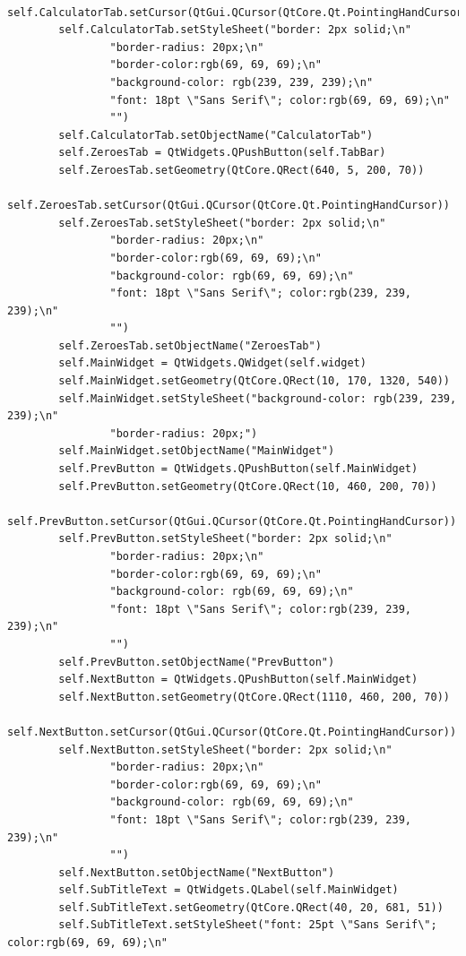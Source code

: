 \documentclass[12pt]{article}
\begin{document}
\begin{lstlisting}
        self.CalculatorTab.setCursor(QtGui.QCursor(QtCore.Qt.PointingHandCursor))
        self.CalculatorTab.setStyleSheet("border: 2px solid;\n"
                "border-radius: 20px;\n"
                "border-color:rgb(69, 69, 69);\n"
                "background-color: rgb(239, 239, 239);\n"
                "font: 18pt \"Sans Serif\"; color:rgb(69, 69, 69);\n"
                "")
        self.CalculatorTab.setObjectName("CalculatorTab")
        self.ZeroesTab = QtWidgets.QPushButton(self.TabBar)
        self.ZeroesTab.setGeometry(QtCore.QRect(640, 5, 200, 70))
        self.ZeroesTab.setCursor(QtGui.QCursor(QtCore.Qt.PointingHandCursor))
        self.ZeroesTab.setStyleSheet("border: 2px solid;\n"
                "border-radius: 20px;\n"
                "border-color:rgb(69, 69, 69);\n"
                "background-color: rgb(69, 69, 69);\n"
                "font: 18pt \"Sans Serif\"; color:rgb(239, 239, 239);\n"
                "")
        self.ZeroesTab.setObjectName("ZeroesTab")
        self.MainWidget = QtWidgets.QWidget(self.widget)
        self.MainWidget.setGeometry(QtCore.QRect(10, 170, 1320, 540))
        self.MainWidget.setStyleSheet("background-color: rgb(239, 239, 239);\n"
                "border-radius: 20px;")
        self.MainWidget.setObjectName("MainWidget")
        self.PrevButton = QtWidgets.QPushButton(self.MainWidget)
        self.PrevButton.setGeometry(QtCore.QRect(10, 460, 200, 70))
        self.PrevButton.setCursor(QtGui.QCursor(QtCore.Qt.PointingHandCursor))
        self.PrevButton.setStyleSheet("border: 2px solid;\n"
                "border-radius: 20px;\n"
                "border-color:rgb(69, 69, 69);\n"
                "background-color: rgb(69, 69, 69);\n"
                "font: 18pt \"Sans Serif\"; color:rgb(239, 239, 239);\n"
                "")
        self.PrevButton.setObjectName("PrevButton")
        self.NextButton = QtWidgets.QPushButton(self.MainWidget)
        self.NextButton.setGeometry(QtCore.QRect(1110, 460, 200, 70))
        self.NextButton.setCursor(QtGui.QCursor(QtCore.Qt.PointingHandCursor))
        self.NextButton.setStyleSheet("border: 2px solid;\n"
                "border-radius: 20px;\n"
                "border-color:rgb(69, 69, 69);\n"
                "background-color: rgb(69, 69, 69);\n"
                "font: 18pt \"Sans Serif\"; color:rgb(239, 239, 239);\n"
                "")
        self.NextButton.setObjectName("NextButton")
        self.SubTitleText = QtWidgets.QLabel(self.MainWidget)
        self.SubTitleText.setGeometry(QtCore.QRect(40, 20, 681, 51))
        self.SubTitleText.setStyleSheet("font: 25pt \"Sans Serif\"; color:rgb(69, 69, 69);\n"

\end{lstlisting}
\end{document}

